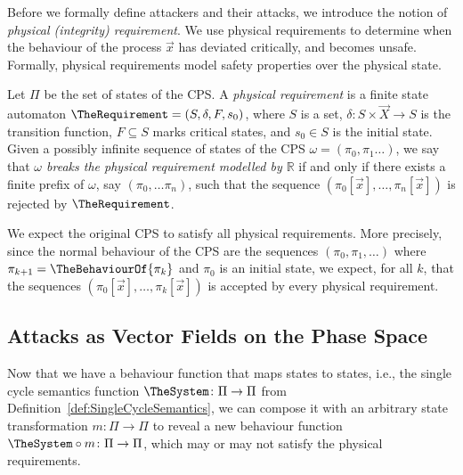 {%

Before we formally define attackers and their attacks, we introduce the notion of \emph{physical (integrity) requirement}. We use physical requirements to determine when the behaviour of the process $\vec{x}$ has deviated critically, and becomes unsafe. Formally, physical requirements model safety properties over the physical state.
\begin{definition}
  Let $\Pi$ be the set of states of the CPS. A \emph{physical requirement} is a finite state automaton $\TheRequirement=(S,\delta,F,s_0)$, where $S$ is a set, $\delta\colon S\times \vec{X}\rightarrow S$ is the transition function, $F\subseteq S$ marks critical states, and $s_0\in S$ is the initial state. Given a possibly infinite sequence of states of the CPS $\omega=(\pi_0,\pi_1 \ldots)$, we say that \emph{$\omega$ breaks the physical requirement modelled by $\mathbb{R}$} if and only if there exists a finite prefix of $\omega$, say $(\pi_0,\ldots\pi_n)$, such that the sequence $(\pi_0[\vec{x}],\ldots, \pi_n[\vec{x}])$ is rejected by $\TheRequirement$.
\end{definition} 
We expect the original CPS to satisfy all physical requirements. More precisely, since the normal behaviour of the CPS are the sequences $(\pi_0, \pi_1, \ldots)$ where $\pi_{k+1}=\TheBehaviourOf{\pi_k}$ and $\pi_0$ is an initial state, we expect, for all $k$, that the sequences $(\pi_0[\vec{x}],\ldots,\pi_k[\vec{x}])$ is accepted by every physical requirement.

\subsection{Attacks as Vector Fields on the Phase Space}
Now that we have a behaviour function that maps states to states, i.e., the single cycle semantics function $\TheSystem\colon\Pi\rightarrow\Pi$ from Definition~\ref{def:SingleCycleSemantics}, we can compose it with an arbitrary state transformation $m\colon \Pi\rightarrow\Pi$ to reveal a new behaviour function $\TheSystem\circ m\colon\Pi\rightarrow\Pi$, which may or may not satisfy the physical requirements.

}
